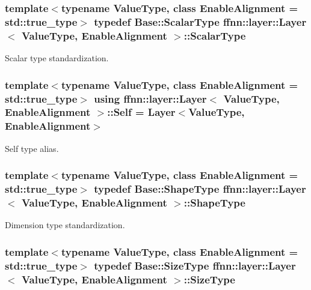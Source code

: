 \hypertarget{classffnn_1_1layer_1_1_layer_acec0144b094cc88faf0771b7ca8ce54c}{
\subsubsection[{Scalar\-Type}]{\setlength{\rightskip}{0pt plus 5cm}template$<$typename Value\-Type, class Enable\-Alignment = std\-::true\-\_\-type$>$ typedef {\bf Base\-::\-Scalar\-Type} {\bf ffnn\-::layer\-::\-Layer}$<$ Value\-Type, Enable\-Alignment $>$\-::{\bf Scalar\-Type}}}\label{classffnn_1_1layer_1_1_layer_acec0144b094cc88faf0771b7ca8ce54c}


Scalar type standardization. 

\hypertarget{classffnn_1_1layer_1_1_layer_af2600ebac2bf33f5a1fb3307d7ef1dbc}{
\subsubsection[{Self}]{\setlength{\rightskip}{0pt plus 5cm}template$<$typename Value\-Type, class Enable\-Alignment = std\-::true\-\_\-type$>$ using {\bf ffnn\-::layer\-::\-Layer}$<$ Value\-Type, Enable\-Alignment $>$\-::{\bf Self} =  {\bf Layer}$<$Value\-Type, Enable\-Alignment$>$}}\label{classffnn_1_1layer_1_1_layer_af2600ebac2bf33f5a1fb3307d7ef1dbc}


Self type alias. 

\hypertarget{classffnn_1_1layer_1_1_layer_a83bc836aeacb312f6507ce1b47f8f7eb}{
\subsubsection[{Shape\-Type}]{\setlength{\rightskip}{0pt plus 5cm}template$<$typename Value\-Type, class Enable\-Alignment = std\-::true\-\_\-type$>$ typedef {\bf Base\-::\-Shape\-Type} {\bf ffnn\-::layer\-::\-Layer}$<$ Value\-Type, Enable\-Alignment $>$\-::{\bf Shape\-Type}}}\label{classffnn_1_1layer_1_1_layer_a83bc836aeacb312f6507ce1b47f8f7eb}


Dimension type standardization. 

\hypertarget{classffnn_1_1layer_1_1_layer_a109e7a20f18d04e6d6f029c816b0958a}{
\subsubsection[{Size\-Type}]{\setlength{\rightskip}{0pt plus 5cm}template$<$typename Value\-Type, class Enable\-Alignment = std\-::true\-\_\-type$>$ typedef {\bf Base\-::\-Size\-Type} {\bf ffnn\-::layer\-::\-Layer}$<$ Value\-Type, Enable\-Alignment $>$\-::{\bf Size\-Type}}}\label{classffnn_1_1layer_1_1_layer_a109e7a20f18d04e6d6f029c816b0958a}


